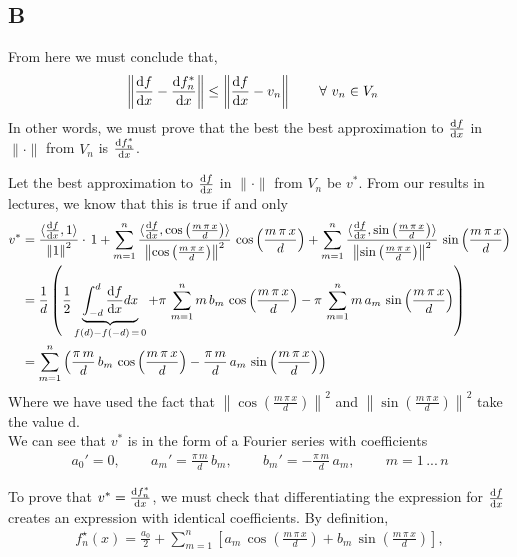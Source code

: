 \documentclass[12pt]{article}
\newcommand{\dfdx}{\frac{{\rm d}f}{{\rm d}x}}
\newcommand{\dfstardx}{\frac{{\rm d}f_n^*}{{\rm d}x}}
\newcommand{\inprod}[2]{\langle #1, #2 \rangle}
\newcommand{\cosmpixd}{\cos \left(\frac{m\,\pi\,x}{d}\right)}
\newcommand{\sinmpixd}{\sin \left(\frac{m\,\pi\,x}{d}\right)}
\newcommand{\norm}[1]{\left\|#1\right\|}
\newcommand{\intd}{\int_{-d}^d}
\begin{document}
\subsection{B}
From here we must conclude that,
\begin{align*}
\left\|\dfdx -\dfstardx\right\| &\leq 
\left\|\dfdx -v_n\right\| \qquad \forall\ v_n \in V_n
\end{align*}
In other words, we must prove that the best the best approximation to $\dfdx$ in $\|\cdot\|$ from $V_n$ is $\dfstardx$.

Let the best approximation to $\dfdx$  in $\|\cdot\|$ from $V_n$ be $v^*$.
From our results in lectures, we know that this is true if and only 
\begin{equation}
\begin{aligned}
	v^{*} &= \frac{\inprod{\dfdx}{1}}{\norm{1}^2}\cdot\,1 + 
			\sum_{m = 1}^n \frac{\inprod{\dfdx}{\cosmpixd}}{\norm{\cosmpixd}^2}\,\cosmpixd +
			\sum_{m = 1}^n \frac{\inprod{\dfdx}{\sinmpixd}}{\norm{\sinmpixd}^2}\,\sinmpixd\\
	&= \frac{1}{d} \left( \frac{1}{2}\underbrace{\intd{\dfdx dx}}_{f(d) - f(-d)\, =\, 0} +
						  \pi\,\sum_{m = 1}^n m\,b_m \, \cosmpixd - 
						  \pi\,\sum_{m = 1}^n m\,a_m \, \sinmpixd 
				   \right)\\
	&= \sum_{m = 1}^n \left(  \frac{\pi\,m}{d}\,b_m \, \cosmpixd - \frac{\pi\,m}{d}\,a_m \, \sinmpixd \right)
\end{aligned}
\end{equation}
Where we have used the fact that  $\norm{\cosmpixd}^2$ and $\norm{\sinmpixd}^2$ take the value d.\\

We can see that $v^*$ is in the form of a Fourier series with coefficients
\begin{align}
	a_0' = 0, \qquad\,
	a_m' =  \frac{\pi\,m}{d}\,b_m, \qquad\,
	b_m' = - \frac{\pi\,m}{d}\,a_m, \qquad\,
	m = 1\,...\,n
\end{align}

To prove that $v^* = \dfstardx$, we must check that differentiating the expression for $\dfdx$
creates an expression with identical coefficients. By definition,
\begin{align}
f_n^\star(x) 
= \frac{a_0}{2} + \sum_{m=1}^n \left[ a_m \,\cos \left(\frac{m\,\pi\,x}{d}
\right) + b_m\,\sin \left(\frac{m\,\pi\,x}{d}\right)\right] ,
\end{align}
\end{document}
